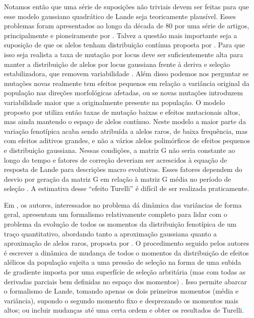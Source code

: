 Notamos então que uma série de suposições não triviais devem ser feitas
para que esse modelo gaussiano quadrático de Lande seja teoricamente
plausível. 
Esses problemas foram apresentados ao longo da década de 80 por uma
série de artigos, principalmente e pioneiramente por \citep{Turelli1984,
Turelli1985, Turelli1986, Barton1987}. 
Talvez a questão mais importante seja a suposição de que os alelos
tenham distribuição contínua proposta por \cite{Crow1964}. 
Para que isso seja realista a taxa de mutação por locus deve ser
suficientemente alta para manter a distribuição de alelos por locus
gaussiana frente à deriva e seleção estabilizadora, que removem
variabilidade \citep{Falconer1996}. 
Além disso podemos nos perguntar se mutações novas realmente tem efeitos
pequenos em relação a variância original da população nas direções
morfológicas afetadas, ou se novas mutações introduzem variabilidade
maior que a originalmente presente na população. 
O modelo proposto por \cite{Turelli1984} utiliza então taxas de mutação
baixas e efeitos mutacionais altos, mas ainda mantendo o espaço de
alelos contínuo. 
Neste modelo a maior parte da variação fenotípica acaba sendo atribuída
a alelos raros, de baixa frequência, mas com efeitos aditivos grandes, e
não a vários alelos polimórficos de efeitos pequenos e distribuição
gaussiana. 
Nessas condições, a matriz G não seria constante ao longo do tempo e
fatores de correção deveriam ser acrescidos à equação de resposta de
Lande para descrições macro evolutivas. 
Esses fatores dependem do desvio por geração da matriz G em relação à
matriz G média no período de seleção \citep{Jones2003}. 
A estimativa desse ``efeito Turelli'' é difícil de ser realizada
praticamente. 

Em \cite{Barton1987}, os autores, interessados no problema dá dinâmica
das variâncias de forma geral, apresentam um formalismo relativamente
completo para lidar com o problema da evolução de todos os momentos da
distribuição fenotípica de um traço quantitativo, abordando tanto a
aproximação gaussiana quanto a aproximação de alelos raros, proposta por
\cite{Turelli1984}. 
O procedimento seguido pelos autores é escrever a dinâmica de mudança de
todos o momentos da distribuição de efeitos alélicos da população
sujeita a uma pressão de seleção na forma de uma subida de gradiente
imposta por uma superfície de seleção arbritária (mas com todas as
derivadas parciais bem definidas no espaço dos momentos)
\citep{Arnold2001a}. 
Isso permite abarcar o formalismo de Lande, tomando apenas os dois
primeiros momentos (média e variância), supondo o segundo momento fixo e
desprezando os momentos mais altos; ou incluir mudanças até uma certa
ordem e obter os resultados de Turelli. 

